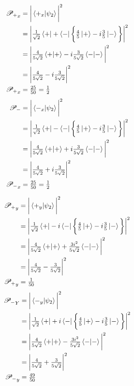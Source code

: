 \documentclass[paper=a4, fontsize=11pt]{scrartcl} %
\numberwithin{equation}{section} %
\numberwithin{figure}{section} %
\numberwithin{table}{section} %
\begin{document}
   \begin{multicols}{2}
 \noindent
\begin{align*}
\mathscr{P_+}_x & = \bigg | \braket{+_x|\psi_2} \bigg|^2 \\
& = \bigg | \tfrac{1}{\sqrt{2}}\bra{+} + \bra{-} \bigg \{ \tfrac{4}{5}\ket{+} - i\tfrac{3}{5}\ket{-} \bigg \} \bigg |^2 \\
& = \bigg |  \tfrac{4}{5\sqrt{2}}\braket{+|+} - i\tfrac{3}{5\sqrt{2}} \braket{-|-}  \bigg |^2 \\
  & = \bigg |  \tfrac{4}{5\sqrt{2}} - i\tfrac{3}{5\sqrt{2}} \bigg |^2 \\
  \mathscr{P_+}_x & = \tfrac{25}{50} = \tfrac{1}{2}
  \end{align*}
   \begin{align*}
\mathscr{P_-} & = \bigg |  \braket{-_x|\psi_2} \bigg|^2 \\
& = \bigg | \tfrac{1}{\sqrt{2}} \bra{+} -\bra{-} \bigg \{ \tfrac{4}{5}\ket{+} - i\tfrac{3}{5}\ket{-} \bigg \} \bigg |^2 \\
& = \bigg |  \tfrac{4}{5\sqrt{2}}\braket{+|+} + i\tfrac{3}{5\sqrt{2}} \braket{-|-}  \bigg |^2 \\
 & = \bigg |  \tfrac{4}{5\sqrt{2}} + i\tfrac{3}{5\sqrt{2}} \bigg |^2 \\
  \mathscr{P_-}_x & = \tfrac{25}{50} = \tfrac{1}{2}
  \end{align*}
  \end{multicols}
\begin{multicols}{2}
\noindent
	\begin{align*}
\mathscr{P_+}_y & = \bigg | \braket{+_y|\psi_2} \bigg|^2 \\
& = \bigg | \tfrac{1}{\sqrt{2}}\bra{+} - i\bra{-} \bigg \{ \tfrac{4}{5}\ket{+} - i\tfrac{3}{5}\ket{-} \bigg \} \bigg |^2 \\
& = \bigg |  \tfrac{4}{5\sqrt{2}}\braket{+|+} + \tfrac{3i^2}{5\sqrt{2}} \braket{-|-}  \bigg |^2 \\
  & = \bigg |  \tfrac{4}{5\sqrt{2}} - \tfrac{3}{5\sqrt{2}} \bigg |^2 \\
  \mathscr{P_+}_y & = \tfrac{1}{50}
  \end{align*}
  \begin{align*}
\mathscr{P_-}_Y & = \bigg |  \braket{-_y|\psi_2} \bigg|^2 \\
& = \bigg | \tfrac{1}{\sqrt{2}} \bra{+} + i \bra{-} \bigg \{ \tfrac{4}{5}\ket{+} - i\tfrac{3}{5}\ket{-} \bigg \} \bigg |^2 \\
& = \bigg |  \tfrac{4}{5\sqrt{2}}\braket{+|+} - \tfrac{3i^2}{5\sqrt{2}} \braket{-|-}  \bigg |^2 \\
 & = \bigg |  \tfrac{4}{5\sqrt{2}} + \tfrac{3}{5\sqrt{2}} \bigg |^2 \\
  \mathscr{P_-}_y & = \tfrac{49}{50}
  \end{align*}
\end{multicols}
\end{document}
